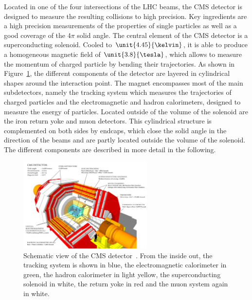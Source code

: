 Located in one of the four intersections of the LHC beams, the CMS detector is designed to measure the resulting collisions to high precision. Key ingredients are a high precision measurements of the properties of single particles as well as a good coverage of the 4$\pi$ solid angle. The central element of the CMS detector is a superconducting solenoid. Cooled to $\unit{4.45}{\kelvin}$, it is able to produce a homogeneous magnetic field of $\unit{3.8}{\tesla}$, which allows to measure the momentum of charged particle by bending their trajectories. As shown in Figure~\ref{fig:CMS}, the different components of the detector are layered in cylindrical shapes around the interaction point. The magnet encompasses most of the main subdetectors, namely the tracking system which measures the trajectories of charged particles and the electromagnetic and hadron calorimeters, designed to measure the energy of particles. Located outside of the volume of the solenoid are the iron return yoke and muon detectors. This cylindrical structure is complemented on both sides by endcaps, which close the solid angle in the direction of the beams and are partly located outside the volume of the solenoid. The different components are described in more detail in the following. 
\begin{figure}[htbp]
\centering
  \includegraphics[width=0.6\textwidth]{plots/CMS/cms_design.png}
\caption{Schematic view of the CMS detector~\cite{CMSScetch}. From the inside out, the tracking system is shown in blue, the electromagnetic calorimeter in green, the hadron calorimeter in light yellow, the superconducting solenoid in white, the return yoke in red and the muon system again in white.}
\label{fig:CMS}
\end{figure}
